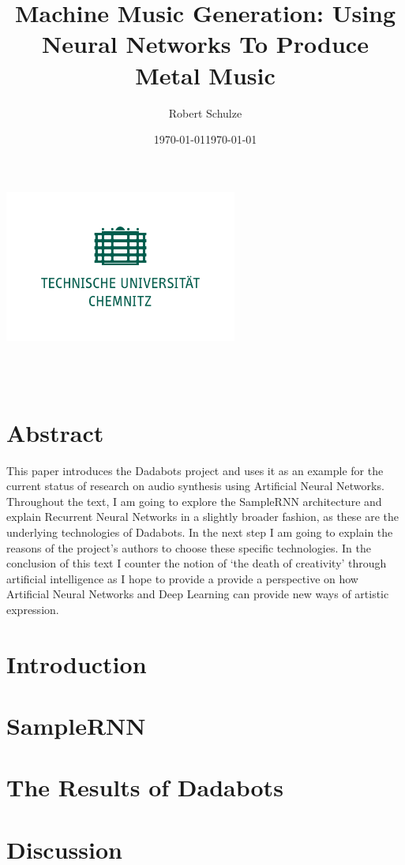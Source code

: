 \documentclass[a4paper, 11pt]{report}
\author{Robert Schulze}
\title{Machine Music Generation: Using Neural Networks To Produce Metal Music}
\date{\today}
\begin{document}
\begin{titlepage}
    \begin{center}
        \includegraphics[height=5cm]{tuc-gruen.png}
        
        \begin{large}
            \thetitle \\
            \theauthor \\
            \date{\today}  
            
        \end{large}
        
    \end{center}
\end{titlepage}

\renewcommand{\thechapter}{\Roman{chapter}}

\setcounter{page}{1} 

\tableofcontents

\chapter{Abstract}

This paper introduces the Dadabots project and uses it as an example for the 
current status of research on audio synthesis using Artificial Neural 
Networks. Throughout the text, I am going to explore the SampleRNN architecture 
and explain Recurrent Neural Networks in a slightly broader fashion, as these 
are the underlying technologies of Dadabots. In the next step I am going to 
explain the reasons of the project’s authors to choose these specific 
technologies. In the conclusion of this text I counter the notion of ‘the death 
of creativity’ through artificial intelligence as I hope to provide a provide 
a perspective on how Artificial Neural Networks and Deep Learning can 
provide new ways of artistic expression.


\chapter{Introduction}

\chapter{SampleRNN}

\chapter{The Results of Dadabots}


\chapter{Discussion}




\end{document}
